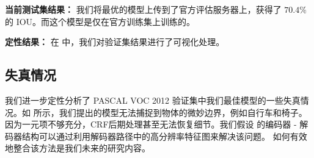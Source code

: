 \textbf{当前测试集结果：} 我们将最优的模型上传到了官方评估服务器上，获得了 $70.4\%$ 的 IOU。而这个模型是仅在官方训练集上训练的。

\textbf{定性结果：} 在  中，我们对验证集结果进行了可视化处理。

\subsection{失真情况}

我们进一步定性分析了 PASCAL VOC 2012 验证集中我们最佳模型的一些失真情况。如  所示，我们提出的模型无法捕捉到物体的微妙边界，例如自行车和椅子。因为一元项不够充分，CRF后期处理甚至无法恢复细节。我们假设 \cite{badrinarayanan2015segnet, ronneberger2015u} 的编码器 - 解码器结构可以通过利用解码器路径中的高分辨率特征图来解决该问题。 如何有效地整合该方法是我们未来的研究内容。

